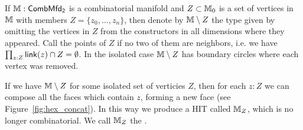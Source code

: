 \begin{mydef}
If \( \mathbb{M}:\mathsf{CombMfd_2} \) is a combinatorial manifold and \( Z\subset \mathbb{M}_0 \) is a set of vertices in \( \mathbb{M} \) with members \( Z=\{z_0,\ldots,z_n\} \), then denote by \( \mathbb{M}\setminus Z \) the type given by omitting the vertices in \( Z \) from the constructors in all dimensions where they appeared. Call the points of \( Z \)  if no two of them are neighbors, i.e. we have \( \prod_{z:Z}\operatorname{\mathsf{link}}(z)\cap Z=\emptyset \). In the isolated case \( \mathbb{M}\setminus Z \) has boundary circles where each vertex was removed.
\end{mydef}

\begin{mydef}
\label{def:replacement}
If we have \( \mathbb{M}\setminus Z \) for some isolated set of verticies \( Z \), then for each \( z:Z \) we can compose all the faces which contain \( z \), forming a new face (see Figure~\ref{fig:hex_concat}). In this way we produce a HIT called \( \mathbb{M}_Z \), which is no longer combinatorial. We call \( \mathbb{M}_Z \) the .
\end{mydef}

